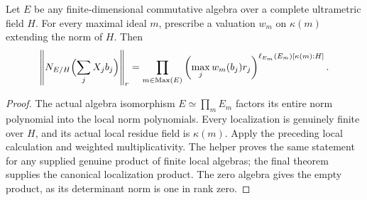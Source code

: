 \begin{theorem}
\label{spectrum:nonetale-finite-weighted-norm}
\leanok
{}
Let $E$ be any finite-dimensional commutative algebra over a complete
ultrametric field $H$. For every maximal ideal $m$, prescribe a valuation
$w_m$ on $\kappa(m)$ extending the norm of $H$. Then
\[
 \left\|N_{E/H}\Bigl(\sum_jX_jb_j\Bigr)\right\|_r
 =\prod_{m\in\operatorname{Max}(E)}
 \left(\max_jw_m(b_j)r_j\right)^{\ell_{E_m}(E_m)[\kappa(m):H]}.
\]
\end{theorem}
\begin{proof}
The actual algebra isomorphism $E\simeq\prod_mE_m$ factors its entire norm
polynomial into the local norm polynomials. Every localization is genuinely
finite over $H$, and its actual local residue field is $\kappa(m)$.
Apply the preceding local calculation and weighted multiplicativity.
The helper proves the same statement for any supplied genuine product of
finite local algebras; the final theorem supplies the canonical localization
product. The zero algebra gives the empty product, as its determinant norm
is one in rank zero.
\end{proof}

